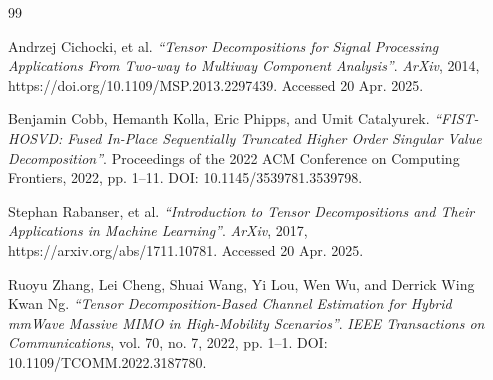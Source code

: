 \documentclass[11pt]{article}
\newcommand\0{\mathbf{0}}
\newcommand\<{\langle}
\renewcommand\>{\rangle}
\begin{document}
\begin{thebibliography}{99}

Andrzej Cichocki, et al. 
\textit{“Tensor Decompositions for Signal Processing Applications From Two-way to Multiway Component Analysis”}.
\textit{ArXiv}, 2014, https://doi.org/10.1109/MSP.2013.2297439. 
Accessed 20 Apr. 2025.

Benjamin Cobb, Hemanth Kolla, Eric Phipps, and Umit Catalyurek. 
\textit{“FIST-HOSVD: Fused In-Place Sequentially Truncated Higher Order Singular Value Decomposition”}.
Proceedings of the 2022 ACM Conference on Computing Frontiers, 2022, pp. 1–11. 
DOI: 10.1145/3539781.3539798.

Stephan Rabanser, et al. 
\textit{“Introduction to Tensor Decompositions and Their Applications in Machine Learning”}.
\textit{ArXiv}, 2017, https://arxiv.org/abs/1711.10781. 
Accessed 20 Apr. 2025.

Ruoyu Zhang, Lei Cheng, Shuai Wang, Yi Lou, Wen Wu, and Derrick Wing Kwan Ng. 
\textit{“Tensor Decomposition-Based Channel Estimation for Hybrid mmWave Massive MIMO in High-Mobility Scenarios”}.
\textit{IEEE Transactions on Communications}, vol. 70, no. 7, 2022, pp. 1–1. 
DOI: 10.1109/TCOMM.2022.3187780.
\end{thebibliography}

\end{document}

